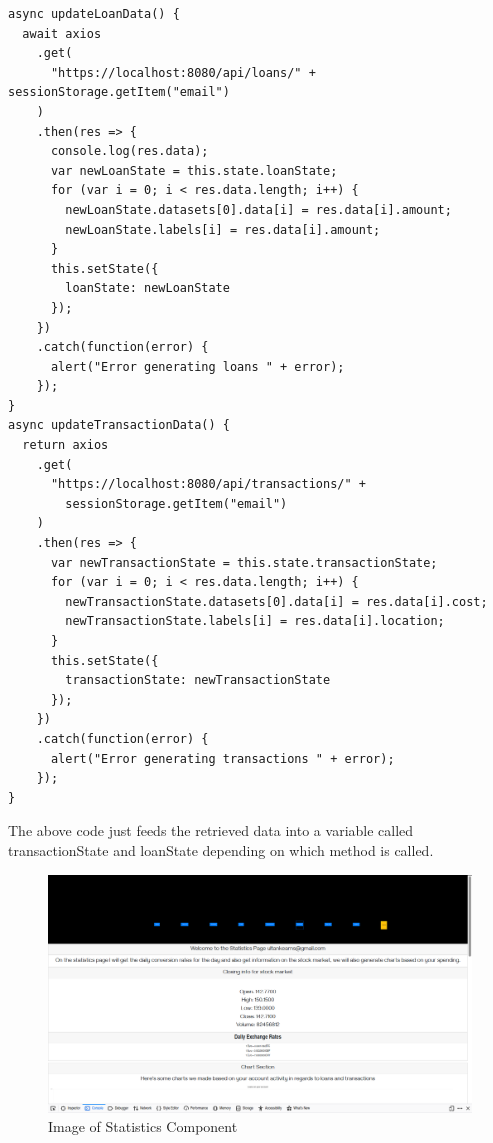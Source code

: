 \begin{verbatim}
async updateLoanData() {
  await axios
    .get(
      "https://localhost:8080/api/loans/" + sessionStorage.getItem("email")
    )
    .then(res => {
      console.log(res.data);
      var newLoanState = this.state.loanState;
      for (var i = 0; i < res.data.length; i++) {
        newLoanState.datasets[0].data[i] = res.data[i].amount;
        newLoanState.labels[i] = res.data[i].amount;
      }
      this.setState({
        loanState: newLoanState
      });
    })
    .catch(function(error) {
      alert("Error generating loans " + error);
    });
}
async updateTransactionData() {
  return axios
    .get(
      "https://localhost:8080/api/transactions/" +
        sessionStorage.getItem("email")
    )
    .then(res => {
      var newTransactionState = this.state.transactionState;
      for (var i = 0; i < res.data.length; i++) {
        newTransactionState.datasets[0].data[i] = res.data[i].cost;
        newTransactionState.labels[i] = res.data[i].location;
      }
      this.setState({
        transactionState: newTransactionState
      });
    })
    .catch(function(error) {
      alert("Error generating transactions " + error);
    });
}
\end{verbatim}
The above code just feeds the retrieved data into a variable called transactionState and loanState depending on which method
is called.
\begin{figure}[H]
\includegraphics[width=\textwidth]{img/statisticscomponent.png}
\caption{Image of Statistics Component}
\label{fig:Image of statistics component}
\end{figure}
